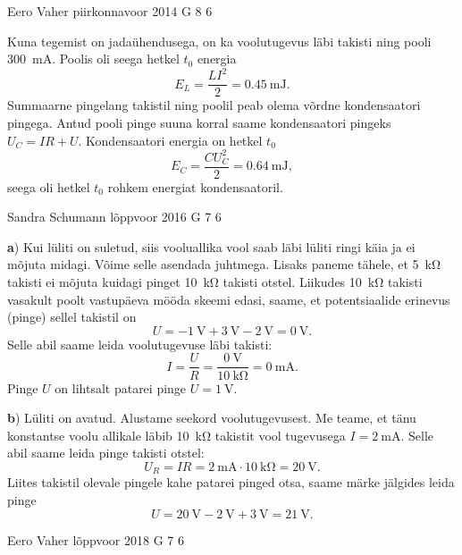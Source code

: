 \documentclass[11pt]{article}
\begin{document}
{%
{Eero Vaher} %
{piirkonnavoor} %
{2014} %
{G 8} %
{6} %
{

\ifSolution
Kuna tegemist on jadaühendusega, on ka voolutugevus läbi takisti ning pooli \SI{300}{\milli\ampere}. Poolis oli seega hetkel $t_0$ energia 
\[
E_L=\frac{LI^2}{2}=\SI{0.45}{\milli\joule}.
\]
Summaarne pingelang takistil ning poolil peab olema võrdne kondensaatori pingega. Antud pooli pinge suuna korral saame kondensaatori pingeks $U_C=IR+U$. Kondensaatori energia on hetkel $t_0$ 
\[
E_C=\frac{CU_C^2}{2}=\SI{0.64}{\milli\joule},
\]
seega oli hetkel $t_0$ rohkem energiat kondensaatoril. 
\fi
}

{Sandra Schumann} %
{lõppvoor} %
{2016} %
{G 7} %
{6} %
{

\ifSolution
{\bf a}) Kui lüliti on suletud, siis vooluallika vool saab läbi lüliti ringi käia ja ei mõjuta midagi. Võime selle asendada juhtmega. Lisaks paneme tähele, et \SI{5}{\kilo\ohm} takisti ei mõjuta kuidagi pinget \SI{10}{\kilo\ohm} takisti otstel. Liikudes \SI{10}{\kilo\ohm} takisti vasakult poolt vastupäeva mööda skeemi edasi, saame, et potentsiaalide erinevus (pinge) sellel takistil on
\[
U = -\SI{1}{\volt} + \SI{3}{\volt} - \SI{2}{\volt} = \SI{0}{\volt}.
\]
Selle abil saame leida voolutugevuse läbi takisti:
\[
I = \frac U R = \frac {\SI{0}{\volt}} {\SI{10}{\kilo\ohm}} = \SI{0}{\milli\ampere}.
\]
Pinge $U$ on lihtsalt patarei pinge $U=\SI{1}{\volt}$.
	
{\bf b}) Lüliti on avatud. Alustame seekord voolutugevusest. Me teame, et tänu konstantse voolu allikale läbib \SI{10}{\kilo\ohm} takistit vool tugevusega $I = \SI{2}{\milli\ampere}$. Selle abil saame leida pinge takisti otstel:
\[
U_R = IR = \SI{2}{\milli\ampere} \cdot \SI{10}{\kilo\ohm} = \SI{20}{\volt}.
\]
Liites takistil olevale pingele kahe patarei pinged otsa, saame märke jälgides leida pinge
\[
U = \SI{20}{\volt} - \SI{2}{\volt} + \SI{3}{\volt} = \SI{21}{\volt}.
\]
\fi
}

{Eero Vaher} %
{lõppvoor} %
{2018} %
{G 7} %
{6} %
{

}}
\end{document}
